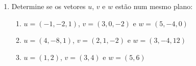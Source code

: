 \documentclass[a4paper,5pt]{amsbook}
\begin{document}
\begin{enumerate}
	\vspace{0.5cm}
	\item Determine se os vetores $u$, $v$ e $w$ est\~ao num mesmo plano:
		\begin{enumerate}
			\item $u=(-1,-2,1)$, $v=(3, 0, -2)$ e $w = (5,-4,0)$
			\item $u=(4,-8,1)$, $v=(2,1,-2)$ e $w=(3,-4,12)$
			\item $u=(1,2)$, $v=(3,4)$ e $w=(5,6)$
		\end{enumerate}
\end{enumerate}
\end{document}

